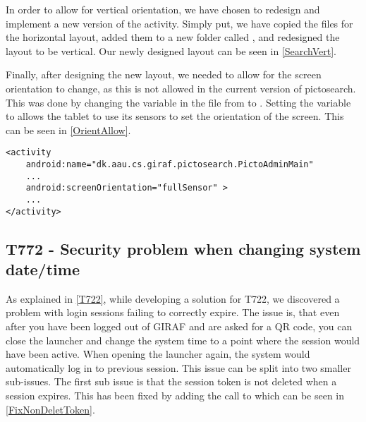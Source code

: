     
In order to allow for vertical orientation, we have chosen to redesign and
implement a new version of the activity. Simply put, we have copied the files
for the horizontal layout, added them to a new folder called
, and redesigned the layout to be vertical. Our newly
designed layout can be seen in \autoref{SearchVert}.


Finally, after designing the new layout, we needed to allow for the screen
orientation to change, as this is not allowed in the current version of
pictosearch. This was done by changing the 
variable in the  file from  to
. Setting the variable to  allows the tablet
to use its sensors to set the orientation of the screen. This can be seen in
\autoref{OrientAllow}.\nl

\begin{minipage}[H]{\linewidth}
\begin{lstlisting}[caption = Allowing changes to the screen orientation., label = OrientAllow] 
<activity
	android:name="dk.aau.cs.giraf.pictosearch.PictoAdminMain"
    ...
    android:screenOrientation="fullSensor" >
    ...
</activity>
\end{lstlisting}
\end{minipage}

\subsection{T772 - Security problem when changing system date/time}\label{T772}
As explained in \autoref{T722}, while developing a solution for T722, we
discovered a problem with login sessions failing to correctly expire.
The issue is, that even after you have been logged out of GIRAF and are asked
for a QR code, you can close the launcher and change the system time to a point
where the session would have been active. When opening the launcher again, the
system would automatically log in to previous session. This issue can be split
into two smaller sub-issues. The first sub issue is that the session token is
not deleted when a session expires. This has been fixed by adding the call to
 which can be seen in \autoref{FixNonDeletToken}.\nl


